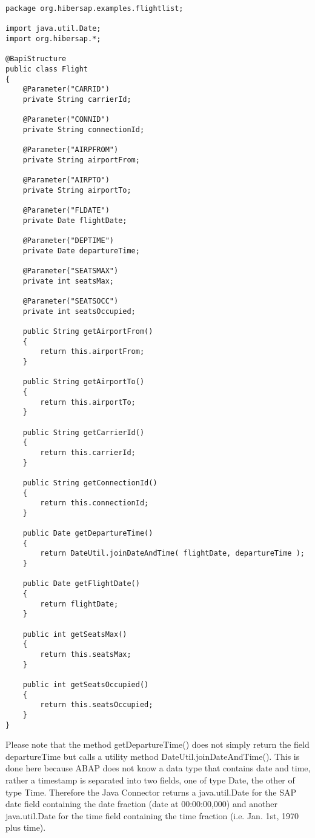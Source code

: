 \begin{Verbatim}[frame=single,label=The Flight class]
package org.hibersap.examples.flightlist;

import java.util.Date;
import org.hibersap.*;

@BapiStructure
public class Flight
{
    @Parameter("CARRID")
    private String carrierId;

    @Parameter("CONNID")
    private String connectionId;

    @Parameter("AIRPFROM")
    private String airportFrom;

    @Parameter("AIRPTO")
    private String airportTo;

    @Parameter("FLDATE")
    private Date flightDate;

    @Parameter("DEPTIME")
    private Date departureTime;

    @Parameter("SEATSMAX")
    private int seatsMax;

    @Parameter("SEATSOCC")
    private int seatsOccupied;

    public String getAirportFrom()
    {
        return this.airportFrom;
    }

    public String getAirportTo()
    {
        return this.airportTo;
    }

    public String getCarrierId()
    {
        return this.carrierId;
    }

    public String getConnectionId()
    {
        return this.connectionId;
    }

    public Date getDepartureTime()
    {
        return DateUtil.joinDateAndTime( flightDate, departureTime );
    }

    public Date getFlightDate()
    {
        return flightDate;
    }

    public int getSeatsMax()
    {
        return this.seatsMax;
    }

    public int getSeatsOccupied()
    {
        return this.seatsOccupied;
    }
}
\end{Verbatim}

Please note that the method getDepartureTime() does not simply return the field departureTime
but calls a utility method DateUtil.joinDateAndTime(). This is done here because ABAP does not know a
data type that contains date and time, rather a timestamp is separated into two fields, one
of type Date, the other of type Time. Therefore the Java Connector returns a java.util.Date for the SAP
date field containing the date fraction (date at 00:00:00,000) and another java.util.Date for the time
field containing the time fraction (i.e. Jan. 1st, 1970 plus time).


